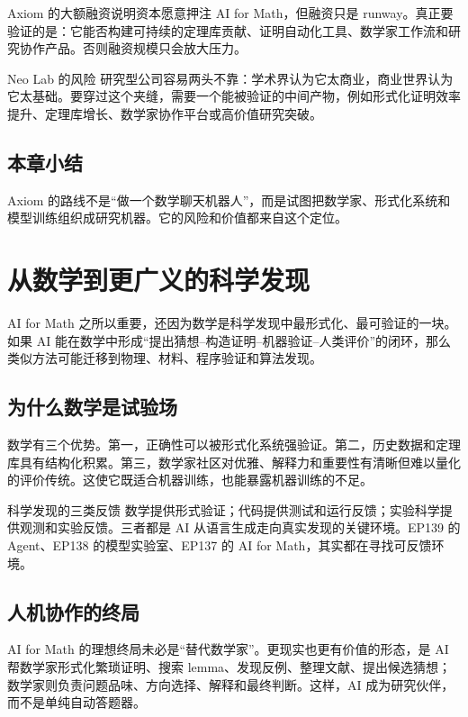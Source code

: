 \documentclass[a4paper]{article}
\begin{document}
Axiom 的大额融资说明资本愿意押注 AI for Math，但融资只是 runway。真正要验证的是：它能否构建可持续的定理库贡献、证明自动化工具、数学家工作流和研究协作产品。否则融资规模只会放大压力。

\begin{warningbox}{Neo Lab 的风险}
研究型公司容易两头不靠：学术界认为它太商业，商业世界认为它太基础。要穿过这个夹缝，需要一个能被验证的中间产物，例如形式化证明效率提升、定理库增长、数学家协作平台或高价值研究突破。
\end{warningbox}

\subsection{本章小结}

Axiom 的路线不是“做一个数学聊天机器人”，而是试图把数学家、形式化系统和模型训练组织成研究机器。它的风险和价值都来自这个定位。

\section{从数学到更广义的科学发现}

AI for Math 之所以重要，还因为数学是科学发现中最形式化、最可验证的一块。如果 AI 能在数学中形成“提出猜想--构造证明--机器验证--人类评价”的闭环，那么类似方法可能迁移到物理、材料、程序验证和算法发现。

\subsection{为什么数学是试验场}

数学有三个优势。第一，正确性可以被形式化系统强验证。第二，历史数据和定理库具有结构化积累。第三，数学家社区对优雅、解释力和重要性有清晰但难以量化的评价传统。这使它既适合机器训练，也能暴露机器训练的不足。

\begin{knowledgebox}{科学发现的三类反馈}
数学提供形式验证；代码提供测试和运行反馈；实验科学提供观测和实验反馈。三者都是 AI 从语言生成走向真实发现的关键环境。EP139 的 Agent、EP138 的模型实验室、EP137 的 AI for Math，其实都在寻找可反馈环境。
\end{knowledgebox}

\subsection{人机协作的终局}

AI for Math 的理想终局未必是“替代数学家”。更现实也更有价值的形态，是 AI 帮数学家形式化繁琐证明、搜索 lemma、发现反例、整理文献、提出候选猜想；数学家则负责问题品味、方向选择、解释和最终判断。这样，AI 成为研究伙伴，而不是单纯自动答题器。
\end{document}
